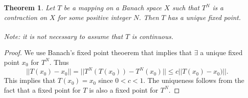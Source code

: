 \documentclass[12pt, a4paper]{article}
\newtheorem{theorem}{Theorem}[section]
\begin{document}
\begin{theorem}
Let $T$ be a mapping on a Banach space $X$ such that $T^N$ is a contraction on $X$ for some positive integer $N$. Then $T$ has a unique fixed point.
\\\\
Note: it is not necessary to assume that $T$ is continuous.
\end{theorem}

\begin{proof}
We use Banach's fixed point theoerem that implies that $\exists$ a unique fixed point $x_0$ for $T^N$. Thus
\begin{equation*}
||T(x_0) - x_0|| = ||T^N(T(x_0)) - T^N(x_0)|| \leq c||T(x_0)-x_0)||.
\end{equation*}
This implies that $T(x_0) = x_0$ since $0<c<1$. The uniqueness follows from the fact that a fixed point for $T$ is also a fixed point for $T^N$.
\end{proof}
\end{document}
